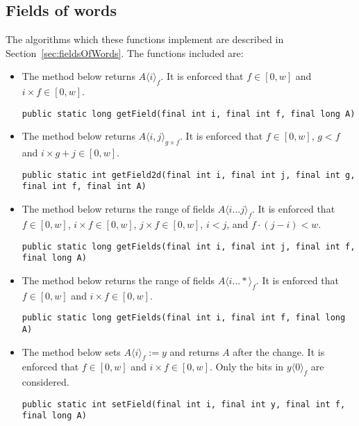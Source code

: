 \subsection{Fields of words}
The algorithms which these functions implement are described in Section~\ref{sec:fieldsOfWords}.
The functions included are:

\begin{itemize}
    \item
    The method below returns $A\langle i\rangle_f$. It is enforced that $f \in [0, w]$ and $i \times f \in [0, w]$.
    \begin{lstlisting}
public static long getField(final int i, final int f, final long A)
    \end{lstlisting}
    
    \item
    The method below returns $A\langle i, j \rangle_{g \times f}$. It is enforced that $f \in [0, w]$, $g < f$ and $i \times g + j \in [0, w]$.
    \begin{lstlisting}
public static int getField2d(final int i, final int j, final int g, final int f, final int A)
    \end{lstlisting}
    
    \item
    The method below returns the range of fields $A\langle i \dots j \rangle_f$. It is enforced that $f \in [0, w]$, $i \times f \in [0, w]$, $j \times f \in [0, w]$, $i < j$, and $f \cdot (j - i) < w$.
    \begin{lstlisting}
public static long getFields(final int i, final int j, final int f, final long A)
    \end{lstlisting}
    
    \item
    The method below returns the range of fields $A\langle i \dots * \rangle_f$. It is enforced that $f \in [0, w]$ and $i \times f \in [0, w]$.
    \begin{lstlisting}
public static long getFields(final int i, final int f, final long A)
    \end{lstlisting}
    
    \item
    The method below sets $A\langle i \rangle_f := y$ and returns $A$ after the change. It is enforced that $f \in [0, w]$ and $i \times f \in [0, w]$. Only the bits in $y\langle 0 \rangle_f$ are considered.
    \begin{lstlisting}
public static int setField(final int i, final int y, final int f, final long A)
    \end{lstlisting}
\end{itemize}

